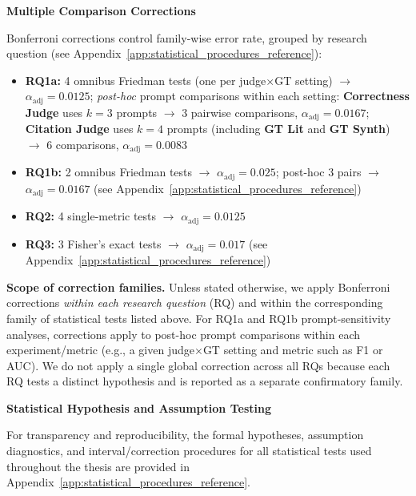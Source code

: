 \noindent\textbf{Multiple Comparison Corrections}
\label{sec:multiple_comparisons}

Bonferroni corrections control family-wise error rate, grouped by research question (see Appendix~\ref{app:statistical_procedures_reference}):
\begin{itemize}[noitemsep]
    \item \textbf{RQ1a:} 4 omnibus Friedman tests (one per judge$\times$GT setting) $\rightarrow$ $\alpha_{\text{adj}} = 0.0125$; \emph{post-hoc} prompt comparisons within each setting: \textbf{Correctness Judge} uses $k=3$ prompts $\rightarrow$ 3 pairwise comparisons, $\alpha_{\text{adj}} = 0.0167$; \textbf{Citation Judge} uses $k=4$ prompts (including \textbf{GT Lit} and \textbf{GT Synth}) $\rightarrow$ 6 comparisons, $\alpha_{\text{adj}} = 0.0083$
    \item \textbf{RQ1b:} 2 omnibus Friedman tests $\rightarrow$ $\alpha_{\text{adj}} = 0.025$; post-hoc 3 pairs $\rightarrow$ $\alpha_{\text{adj}} = 0.0167$ (see Appendix~\ref{app:statistical_procedures_reference})
    \item \textbf{RQ2:} 4 single-metric tests $\rightarrow$ $\alpha_{\text{adj}} = 0.0125$
    \item \textbf{RQ3:} 3 Fisher's exact tests $\rightarrow$ $\alpha_{\text{adj}} = 0.017$ (see Appendix~\ref{app:statistical_procedures_reference})
\end{itemize}

\textbf{Scope of correction families.} Unless stated otherwise, we apply Bonferroni corrections \emph{within each research question} (RQ) and within the corresponding family of statistical tests listed above. For RQ1a and RQ1b prompt-sensitivity analyses, corrections apply to post-hoc prompt comparisons within each experiment/metric (e.g., a given judge$\times$GT setting and metric such as F1 or AUC). We do not apply a single global correction across all RQs because each RQ tests a distinct hypothesis and is reported as a separate confirmatory family.

\noindent\textbf{Statistical Hypothesis and Assumption Testing}
\label{sec:test_interpretation}

For transparency and reproducibility, the formal hypotheses, assumption diagnostics, and interval/correction procedures for all statistical tests used throughout the thesis are provided in Appendix~\ref{app:statistical_procedures_reference}.

